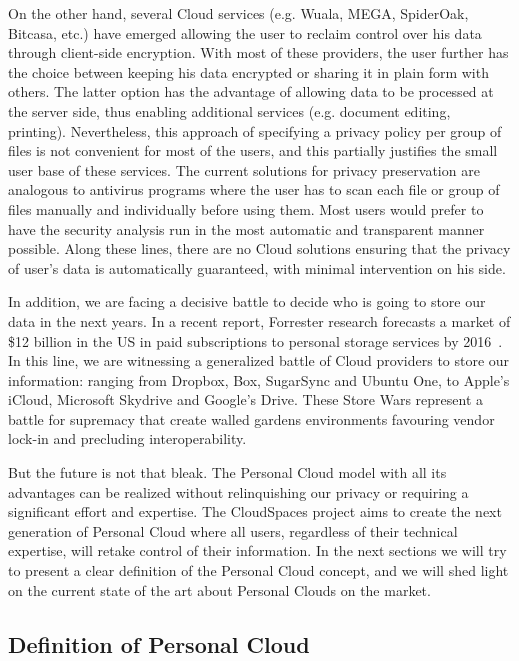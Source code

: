 On the other hand, several Cloud services (e.g. Wuala, MEGA, SpiderOak, Bitcasa, etc.) have emerged allowing the user to reclaim control over his data through client-side encryption. With most of these providers, the user further has the choice between keeping his data encrypted or sharing it in plain form with others. The latter option has the advantage of allowing data to be processed at the server side, thus enabling additional services (e.g. document editing, printing). Nevertheless, this approach of specifying a privacy policy per group of files is not convenient for most of the users, and this partially justifies the small user base of these services. The current solutions for privacy preservation are analogous to antivirus programs where the user has to scan each file or group of files manually and individually before using them. Most users would prefer to have the security analysis run in the most automatic and transparent manner possible. Along these lines, there are no Cloud solutions ensuring that the privacy of user's data is automatically guaranteed, with minimal intervention on his side.


In addition, we are facing a decisive battle to decide who is going to store our data in the next years.  In a recent report, Forrester research forecasts a market of \$12 billion in the US in paid subscriptions to personal storage services by 2016~\cite{forrester}. In this line, we are witnessing a generalized battle of Cloud providers to store our information: ranging from Dropbox, Box, SugarSync and Ubuntu One, to Apple's iCloud, Microsoft Skydrive and Google's Drive. These Store Wars represent  a battle for supremacy that create walled gardens environments favouring vendor lock-in and precluding interoperability.


But the future is not that bleak. The Personal Cloud model with all its advantages can be realized without relinquishing our privacy or requiring a significant effort and expertise.  The CloudSpaces project aims to create the next generation of Personal Cloud where all users, regardless of their technical expertise, will retake control of their information. In the next sections we will try to present a clear definition of the Personal Cloud concept, and we will shed light on the current state of the art about Personal Clouds on the market.



\subsection{Definition of Personal Cloud}

